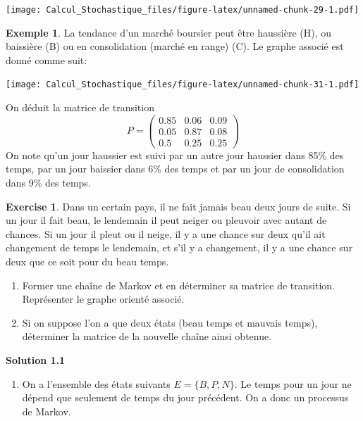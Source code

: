 \documentclass[
]{book}
\providecommand{\tightlist}{%
  \setlength{\itemsep}{0pt}\setlength{\parskip}{0pt}}
\theoremstyle{definition}
\theoremstyle{definition}
\newtheorem{example}{Exemple}[chapter]
\theoremstyle{definition}
\newtheorem{exercise}{Exercise}[chapter]
\theoremstyle{remark}
\begin{document}
\texttt{[image: Calcul\_Stochastique\_files/figure-latex/unnamed-chunk-29-1.pdf]}
\begin{example}
\protect\hypertarget{exm:unnamed-chunk-30}{}{\label{exm:unnamed-chunk-30} }La tendance d'un marché boursier peut être haussière (H), ou baissière (B) ou en consolidation (marché en range) (C). Le graphe associé est donné comme suit:
\end{example}
\texttt{[image: Calcul\_Stochastique\_files/figure-latex/unnamed-chunk-31-1.pdf]}

On déduit la matrice de transition
\[
P=\left( 
\begin{array}{ccc}
0.85 & 0.06 & 0.09 \\
0.05 & 0.87 & 0.08 \\
0.5 & 0.25 & 0.25
\end{array}
\right)
\]
On note qu'un jour haussier est suivi par un autre jour haussier dans 85\% des temps, par un jour baissier dans 6\% des temps et par un jour de consolidation dans 9\% des temps.
\begin{exercise}
\protect\hypertarget{exr:unnamed-chunk-32}{}{\label{exr:unnamed-chunk-32} }Dans un certain pays, il ne fait jamais beau deux jours de suite. Si un jour il fait beau, le lendemain il peut neiger ou pleuvoir avec autant de chances. Si un jour il pleut ou il neige, il y a une chance sur deux qu'il ait changement de temps le lendemain, et s'il y a changement, il y a une chance sur deux que ce soit pour du beau temps.

\begin{enumerate}
\def\labelenumi{\arabic{enumi}.}
\tightlist
\item
  Former une chaîne de Markov et en déterminer sa matrice de transition. Représenter le graphe orienté associé.
\item
  Si on suppose l'on a que deux états (beau temps et mauvais temps), déterminer la matrice de la nouvelle chaîne ainsi obtenue.
\end{enumerate}
\end{exercise}

\textbf{Solution 1.1}

\begin{enumerate}
\def\labelenumi{\arabic{enumi}.}
\tightlist
\item
  On a l'ensemble des états suivants \(E=\{B,P,N \}\). Le temps pour un jour ne dépend que seulement de temps du jour précédent. On a donc un processus de Markov.
\end{enumerate}
\end{document}
